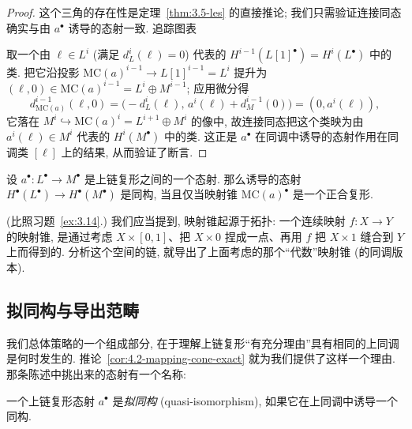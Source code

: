 \begin{proof}
这个三角的存在性是定理~\ref{thm:3.5-les} 的直接推论; 我们只需验证连接同态确实与由 $a^\bullet$ 诱导的态射一致. 追踪图表
\begin{center}
\end{center}
取一个由 $\ell\in L^i$ (满足 $d_L^i(\ell)=0$) 代表的 $H^{i-1}(L[1]^\bullet)=H^i(L^\bullet)$ 中的类. 把它沿投影 $\mathrm{MC}(a)^{i-1}\to L[1]^{i-1}=L^i$ 提升为 $(\ell,0)\in\mathrm{MC}(a)^{i-1}=L^i\oplus M^{i-1}$; 应用微分得
\[
d_{\mathrm{MC}(a)}^{i-1}(\ell,0)=\bigl(-d_L^i(\ell),\, a^i(\ell)+d_M^{i-1}(0)\bigr)=(0,a^i(\ell)),
\]
它落在 $M^i\hookrightarrow\mathrm{MC}(a)^i=L^{i+1}\oplus M^i$ 的像中, 故连接同态把这个类映为由 $a^i(\ell)\in M^i$ 代表的 $H^i(M^\bullet)$ 中的类. 这正是 $a^\bullet$ 在同调中诱导的态射作用在同调类 $[\ell]$ 上的结果, 从而验证了断言.
\end{proof}

\begin{corollary}\label{cor:4.2-mapping-cone-exact}
设 $a^\bullet:L^\bullet\to M^\bullet$ 是上链复形之间的一个态射. 那么诱导的态射 $H^\bullet(L^\bullet)\to H^\bullet(M^\bullet)$ 是同构, 当且仅当映射锥 $\mathrm{MC}(a)^\bullet$ 是一个正合复形.
\end{corollary}

(比照习题~\ref{ex:3.14}.)
\indent 我们应当提到, 映射锥起源于拓扑: 一个连续映射 $f:X\to Y$ 的映射锥, 是通过考虑 $X\times[0,1]$、把 $X\times0$ 捏成一点、再用 $f$ 把 $X\times1$ 缝合到 $Y$ 上而得到的. 分析这个空间的链, 就导出了上面考虑的那个``代数''映射锥 (的同调版本).

\subsection{拟同构与导出范畴}
\label{subsec:4.2-quasi-iso-derived}

我们总体策略的一个组成部分, 在于理解上链复形``有充分理由''具有相同的上同调是何时发生的. 推论~\ref{cor:4.2-mapping-cone-exact} 就为我们提供了这样一个理由. 那条陈述中挑出来的态射有一个名称:

\begin{definition}\label{def:4.3-quasi-isomorphism}
一个上链复形态射 $a^\bullet$ 是\emph{拟同构} (quasi-isomorphism), 如果它在上同调中诱导一个同构.
\end{definition}

